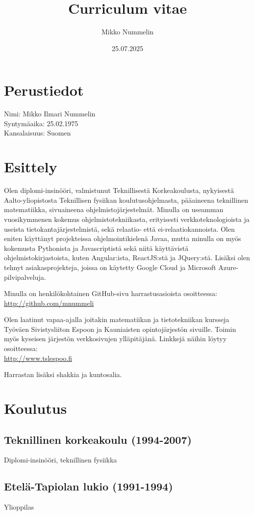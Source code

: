 \documentclass[a4paper,12pt]{article}
\title{Curriculum vitae}
\author{Mikko Nummelin}
\date{25.07.2025}
\begin{document}
\maketitle
\section*{Perustiedot}
Nimi: Mikko Ilmari Nummelin \\
Syntymäaika: 25.02.1975 \\
Kansalaisuus: Suomen
\section*{Esittely}

Olen diplomi-insinööri, valmistunut Teknillisestä Korkeakoulusta, nykyisestä Aalto-yliopistosta Teknillisen fysiikan koulutusohjelmasta, pääaineena teknillinen matematiikka, sivuaineena ohjelmistojärjestelmät. Minulla on useamman
vuosikymmenen kokemus ohjelmistotekniikasta, erityisesti verkkoteknologioista ja useista tietokantajärjestelmistä, sekä relaatio- että ei-relaatiokannoista. Olen eniten käyttänyt projekteissa ohjelmointikielenä Javaa, mutta minulla on myös kokemusta Pythonista ja Javascriptistä sekä niitä käyttävistä ohjelmistokirjastoista, kuten Angular:ista, ReactJS:stä ja JQuery:stä. Lisäksi olen tehnyt
asiakasprojekteja, joissa on käytetty Google Cloud ja Microsoft Azure-pilvipalveluja.

Minulla on henkilökohtainen GitHub-sivu harrastusasioista osoitteessa:\\
\href{http://github.com/mnummeli}{http://github.com/mnummeli}

Olen laatinut vapaa-ajalla joitakin matematiikan ja tietotekniikan kursseja Työväen Sivistysliiton Espoon ja Kauniaisten opintojärjestön sivuille. Toimin myös kyseisen järjestön verkkosivujen ylläpitäjänä. Linkkejä näihin löytyy osoitteessa:\\
\href{http://www.tslespoo.fi}{http://www.tslespoo.fi}

Harrastan lisäksi shakkia ja kuntosalia.
\section*{Koulutus}
\subsection*{Teknillinen korkeakoulu (1994-2007)}
Diplomi-insinööri, teknillinen fysiikka
\subsection*{Etelä-Tapiolan lukio (1991-1994)}
Ylioppilas
\end{document}

